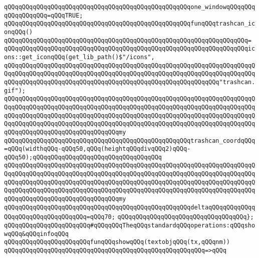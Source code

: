 \verb|qQQqqQQqqQQqqQQqqQQqqQQqqQQqqQQqqQQqqQQqqQQqqQQqqQQqone_windowqQQqqQQqqQQqqQQqqQQq=qQQqTRUE;|\newline
\newline
\verb|qQQqqQQqqQQqqQQqqQQqqQQqqQQqqQQqqQQqqQQqqQQqqQQqqQQqfunqQQqtrashcan_iconqQQq()|\newline
\verb|qQQqqQQqqQQqqQQqqQQqqQQqqQQqqQQqqQQqqQQqqQQqqQQqqQQqqQQqqQQqqQQqqQQq=|\newline
\verb|qQQqqQQqqQQqqQQqqQQqqQQqqQQqqQQqqQQqqQQqqQQqqQQqqQQqqQQqqQQqqQQqqQQqicons::get_iconqQQq(get_lib_path()$"/icons",|\newline
\verb|qQQqqQQqqQQqqQQqqQQqqQQqqQQqqQQqqQQqqQQqqQQqqQQqqQQqqQQqqQQqqQQqqQQqqQQqqQQqqQQqqQQqqQQqqQQqqQQqqQQqqQQqqQQqqQQqqQQqqQQqqQQqqQQqqQQqqQQqqQQqqQQqqQQqqQQqqQQqqQQqqQQqqQQqqQQqqQQqqQQqqQQqqQQqqQQqqQQqqQQq"trashcan.gif");|\newline
\verb|qQQqqQQqqQQqqQQqqQQqqQQqqQQqqQQqqQQqqQQqqQQqqQQqqQQqqQQqqQQqqQQqqQQqqQQqqQQqqQQqqQQqqQQqqQQqqQQqqQQqqQQqqQQqqQQqqQQqqQQqqQQqqQQqqQQqqQQqqQQqqQQqqQQqqQQqqQQqqQQqqQQqqQQqqQQqqQQqqQQqqQQqqQQqqQQqqQQqqQQqqQQqqQQqqQQqqQQqqQQqqQQqqQQqqQQqqQQqqQQqqQQqqQQqqQQqqQQqqQQqqQQqqQQqqQQqqQQqqQQqqQQqqQQqqQQqqQQqqQQqqQQqqQQqqQQqmy|\newline
\verb|qQQqqQQqqQQqqQQqqQQqqQQqqQQqqQQqqQQqqQQqqQQqqQQqqQQqtrashcan_coordqQQq=qQQq(widthqQQq-qQQq50,qQQq(heightqQQqdivqQQq2)qQQq-qQQq50);qQQqqQQqqQQqqQQqqQQqqQQqqQQqqQQqqQQq|\newline
\verb|qQQqqQQqqQQqqQQqqQQqqQQqqQQqqQQqqQQqqQQqqQQqqQQqqQQqqQQqqQQqqQQqqQQqqQQqqQQqqQQqqQQqqQQqqQQqqQQqqQQqqQQqqQQqqQQqqQQqqQQqqQQqqQQqqQQqqQQqqQQqqQQqqQQqqQQqqQQqqQQqqQQqqQQqqQQqqQQqqQQqqQQqqQQqqQQqqQQqqQQqqQQqqQQqqQQqqQQqqQQqqQQqqQQqqQQqqQQqqQQqqQQqqQQqqQQqqQQqqQQqqQQqqQQqqQQqqQQqqQQqqQQqqQQqqQQqqQQqqQQqqQQqqQQqqQQqmy|\newline
\verb|qQQqqQQqqQQqqQQqqQQqqQQqqQQqqQQqqQQqqQQqqQQqqQQqqQQqdeltaqQQqqQQqqQQqqQQqqQQqqQQqqQQqqQQqqQQq=qQQq70;|\newline
\newline
\verb|qQQqqQQqqQQqqQQqqQQqqQQqqQQqqQQqqQQq};|\newline
\newline
\verb|qQQqqQQqqQQqqQQqqQQqqQQq#qQQqqQQqTheqQQqstandardqQQqoperations:qQQqshowqQQq&qQQqinfoqQQq|\newline
\newline
\verb|qQQqqQQqqQQqqQQqqQQqqQQqfunqQQqshowqQQq(textobjqQQq(tx,qQQqnm))|\newline
\verb|qQQqqQQqqQQqqQQqqQQqqQQqqQQqqQQqqQQqqQQqqQQqqQQqqQQqqQQq=>qQQq|\newline
